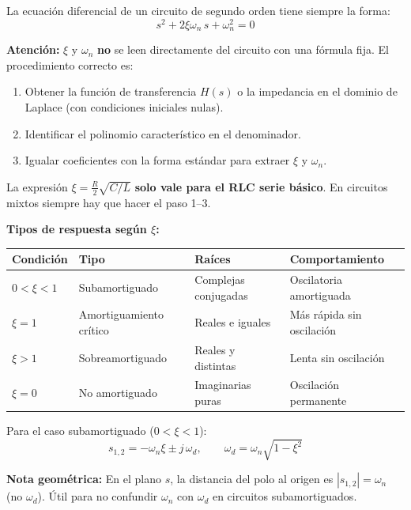 \documentclass[12pt,a4paper]{article}
\begin{document}
La ecuación diferencial de un circuito de segundo orden tiene siempre la forma:
\[
  s^2 + 2\xi\omega_n\,s + \omega_n^2 = 0
\]

\begin{warnbox}
\textbf{\color{warnorangeline}Atención:} $\xi$ y $\omega_n$ \textbf{no} se leen
directamente del circuito con una fórmula fija. El procedimiento correcto es:
\begin{enumerate}[leftmargin=1.5em, itemsep=3pt]
  \item Obtener la función de transferencia $H(s)$ o la impedancia en el dominio de
        Laplace (con condiciones iniciales nulas).
  \item Identificar el polinomio característico en el denominador.
  \item Igualar coeficientes con la forma estándar para extraer $\xi$ y $\omega_n$.
\end{enumerate}
La expresión $\xi = \tfrac{R}{2}\sqrt{C/L}$ \textbf{solo vale para el RLC serie básico}.
En circuitos mixtos siempre hay que hacer el paso 1--3.
\end{warnbox}

\medskip
\textbf{Tipos de respuesta según $\xi$:}

\begin{center}
\renewcommand{\arraystretch}{1.4}
\begin{tabular}{llll}
\toprule
\textbf{Condición} & \textbf{Tipo} & \textbf{Raíces} & \textbf{Comportamiento}\\
\midrule
$0 < \xi < 1$ & Subamortiguado    & Complejas conjugadas & Oscilatoria amortiguada\\
$\xi = 1$     & Amortiguamiento crítico & Reales e iguales & Más rápida sin oscilación\\
$\xi > 1$     & Sobreamortiguado  & Reales y distintas   & Lenta sin oscilación\\
$\xi = 0$     & No amortiguado    & Imaginarias puras    & Oscilación permanente\\
\bottomrule
\end{tabular}
\end{center}

Para el caso subamortiguado ($0 < \xi < 1$):
\[
  s_{1,2} = -\omega_n\xi \pm j\,\omega_d, \qquad \omega_d = \omega_n\sqrt{1-\xi^2}
\]

\textbf{Nota geométrica:} En el plano $s$, la distancia del polo al origen es
$|s_{1,2}| = \omega_n$ (no $\omega_d$). Útil para no confundir $\omega_n$ con $\omega_d$
en circuitos subamortiguados.
\end{document}
